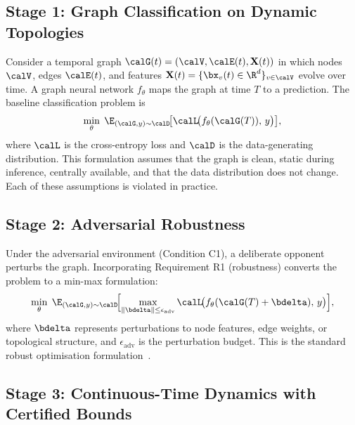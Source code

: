 \subsection{Stage 1: Graph Classification on Dynamic Topologies}

Consider a temporal graph $\calG(t)=(\calV,\calE(t),\mathbf{X}(t))$ in which nodes $\calV$, edges $\calE(t)$, and features $\mathbf{X}(t)=\{\bx_v(t)\in\R^{d}\}_{v\in\calV}$ evolve over time. A graph neural network $f_\theta$ maps the graph at time $T$ to a prediction. The baseline classification problem is
\begin{equation}
\min_\theta\;
\E_{(\calG,y)\sim\calD}\!\bigl[
  \calL\!\bigl(f_\theta(\calG(T)),\,y\bigr)
\bigr],
\label{eq:ps_base}
\end{equation}
where $\calL$ is the cross-entropy loss and $\calD$ is the data-generating distribution. This formulation assumes that the graph is clean, static during inference, centrally available, and that the data distribution does not change. Each of these assumptions is violated in practice.


\subsection{Stage 2: Adversarial Robustness}

Under the adversarial environment (Condition C1), a deliberate opponent perturbs the graph. Incorporating Requirement R1 (robustness) converts the problem to a min-max formulation:
\begin{equation}
\min_\theta\;
\E_{(\calG,y)\sim\calD}\!\Bigl[
  \max_{\|\bdelta\|\le\epsilon_{\mathrm{adv}}}
    \calL\!\bigl(f_\theta(\calG(T)+\bdelta),\,y\bigr)
\Bigr],
\label{eq:ps_robust}
\end{equation}
where $\bdelta$ represents perturbations to node features, edge weights, or topological structure, and $\epsilon_{\mathrm{adv}}$ is the perturbation budget. This is the standard robust optimisation formulation~\cite{Madry2018,Goodfellow2015,Szegedy2014}.


\subsection{Stage 3: Continuous-Time Dynamics with Certified Bounds}

